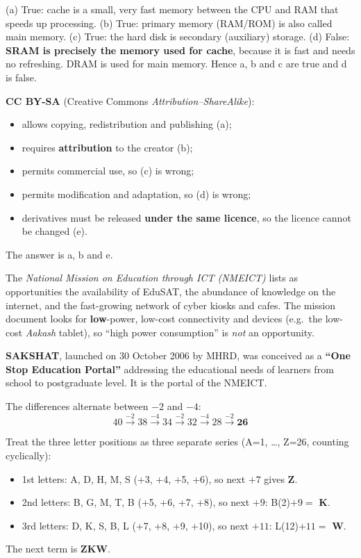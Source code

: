 (a) True: cache is a small, very fast memory between the CPU and RAM that speeds up processing.
(b) True: primary memory (RAM/ROM) is also called main memory.
(c) True: the hard disk is secondary (auxiliary) storage.
(d) False: \textbf{SRAM is precisely the memory used for cache}, because it is fast and needs no refreshing. DRAM is used for main memory.
Hence a, b and c are true and d is false.

\textbf{CC BY-SA} (Creative Commons \emph{Attribution--ShareAlike}):
\begin{itemize}
\item allows copying, redistribution and publishing (a);
\item requires \textbf{attribution} to the creator (b);
\item permits commercial use, so (c) is wrong;
\item permits modification and adaptation, so (d) is wrong;
\item derivatives must be released \textbf{under the same licence}, so the licence cannot be changed (e).
\end{itemize}
The answer is a, b and e.

The \emph{National Mission on Education through ICT (NMEICT)} lists as opportunities the availability of EduSAT, the abundance of knowledge on the internet, and the fast-growing network of cyber kiosks and cafes. The mission document looks for \textbf{low}-power, low-cost connectivity and devices (e.g.\ the low-cost \emph{Aakash} tablet), so ``high power consumption'' is \emph{not} an opportunity.

\textbf{SAKSHAT}, launched on 30 October 2006 by MHRD, was conceived as a \textbf{``One Stop Education Portal''} addressing the educational needs of learners from school to postgraduate level. It is the portal of the NMEICT.

The differences alternate between $-2$ and $-4$:
\[40\xrightarrow{-2}38\xrightarrow{-4}34\xrightarrow{-2}32\xrightarrow{-4}28\xrightarrow{-2}\mathbf{26}\]

Treat the three letter positions as three separate series (A=1, \ldots, Z=26, counting cyclically):
\begin{itemize}
\item 1st letters: A, D, H, M, S (+3, +4, +5, +6), so next $+7$ gives \textbf{Z}.
\item 2nd letters: B, G, M, T, B (+5, +6, +7, +8), so next $+9$: B(2)$+9=$ \textbf{K}.
\item 3rd letters: D, K, S, B, L (+7, +8, +9, +10), so next $+11$: L(12)$+11=$ \textbf{W}.
\end{itemize}
The next term is \textbf{ZKW}.

